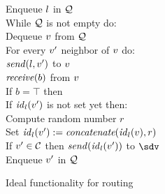 \begin{figure*}[htb]
\begin{center}
{\begin{minipage}[t]{0.65\textwidth}
{		\quad Enqueue $l$ in $\mathcal{Q}$\\
		\quad While $\mathcal{Q}$ is not empty do:\\
		\quad \quad Dequeue $v$ from $\mathcal{Q}$\\
		\quad \quad For every $v'$ neighbor of $v$ do:\\
		\quad \quad \quad $\mathit{send}(l, v')$ to $v$\\
		\quad \quad \quad $\mathit{receive}(b)$ from $v$\\
		\quad \quad \quad If $b = \top$ then\\
		\quad \quad \quad \quad If $\mathit{id}_{l}(v')$ is not set yet then:\\
		\quad \quad \quad \quad \quad Compute random number $r$\\
		\quad 
		\quad \quad \quad \quad Set $\mathit{id}_{l}(v') := \textit{concatenate}(\mathit{id}_{l}(v), r)$\\
		\quad \quad \quad \quad \quad If $v' \in \mathcal{C}$ then $\mathit{send}(\mathit{id}_{l}(v'))$ to $\sdv$\\
		\quad \quad \quad \quad Enqueue $v'$ in $\mathcal{Q}$
		}
		\end{minipage}
	}
	\end{center}
	
	\caption{Ideal functionality for routing}
	\label{fig:ideal-routing}
\end{figure*}

